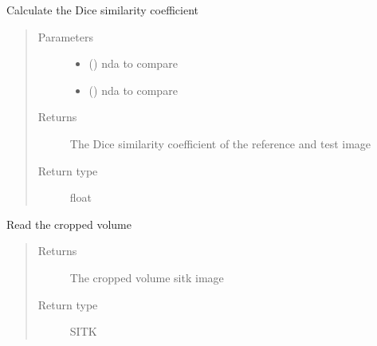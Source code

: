 \documentclass[letterpaper,10pt,english]{sphinxmanual}
\begin{document}
\begin{fulllineitems}
\label{\detokenize{test:test_image_preprocessing.DSC}}
\sphinxAtStartPar
Calculate the Dice similarity coefficient
\begin{quote}\begin{description}
\item[{Parameters}] \leavevmode\begin{itemize}
\item {} 
\sphinxAtStartPar
{} () \textendash{} nda to compare

\item {} 
\sphinxAtStartPar
{} () \textendash{} nda to compare

\end{itemize}

\item[{Returns}] \leavevmode
\sphinxAtStartPar
The Dice similarity coefficient of the reference and test image

\item[{Return type}] \leavevmode
\sphinxAtStartPar
float

\end{description}\end{quote}

\end{fulllineitems}


\begin{fulllineitems}
\label{\detokenize{test:test_image_preprocessing.get_cropped_volume_image}}
\sphinxAtStartPar
Read the cropped volume
\begin{quote}\begin{description}
\item[{Returns}] \leavevmode
\sphinxAtStartPar
The cropped volume sitk image

\item[{Return type}] \leavevmode
\sphinxAtStartPar
SITK

\end{description}\end{quote}

\end{fulllineitems}
\end{document}
